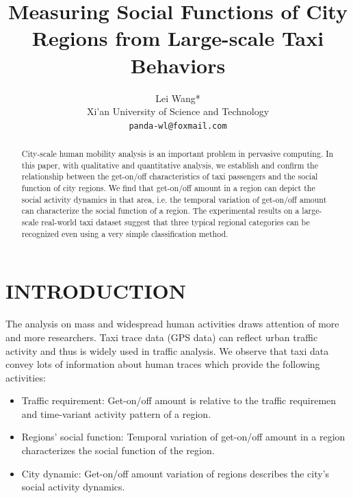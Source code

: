 \documentclass[a4paper, 10pt, conference]{ieeeconf}      %
\title{\LARGE \bf
Measuring Social Functions of City Regions from Large-scale Taxi Behaviors
}
\author{ \parbox{3 in}{\centering Lei Wang*\\
        Xi'an University of Science and Technology\\
        {\tt\small panda-wl@foxmail.com}}
}
\begin{document}
\maketitle
\thispagestyle{empty}
\pagestyle{empty}

\begin{abstract}

City-scale human mobility analysis is an important problem in pervasive computing. In this paper, with qualitative and quantitative analysis, we establish and confirm the relationship between the get-on/off characteristics of taxi passengers and the social function of city regions. We find that get-on/off amount in a region can depict the social activity dynamics in that area, i.e. the temporal variation of get-on/off amount can characterize the social function of a region. The experimental results on a large-scale real-world taxi dataset suggest that three typical regional categories can be recognized even using a very simple classification method.

\end{abstract}

\section{INTRODUCTION}%

The analysis on mass and widespread human activities draws attention of more and more researchers. Taxi trace data (GPS data) can reflect urban traffic activity and thus is widely used in traffic analysis. We observe that taxi data convey lots of information about human traces which provide the following activities:

\begin{itemize}

\item Traffic requirement: Get-on/off amount is relative to the traffic requiremen and time-variant activity pattern of a region.
\item Regions’ social function: Temporal variation of get-on/off amount in a region characterizes the social function of the region.
\item City dynamic: Get-on/off amount variation of regions describes the city’s social activity dynamics.

\end{itemize}
\end{document}
